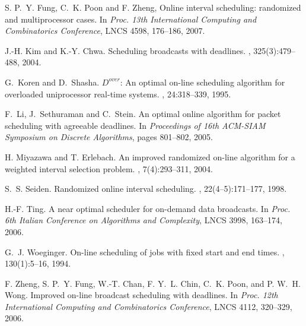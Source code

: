 \documentclass[11pt]{article}
\begin{document}
\begin{thebibliography}{10}
S. P.~Y. Fung, C.~K. Poon and F. Zheng,
\newblock Online interval scheduling: randomized and multiprocessor cases.
\newblock In {\em Proc. 13th International Computing and Combinatorics
Conference}, LNCS 4598, 176--186, 2007.

J.-H. Kim and K.-Y. Chwa.
\newblock Scheduling broadcasts with deadlines.
, 325(3):479--488, 2004.

G.~Koren and D.~Shasha.
\newblock $D^{over}$: An optimal on-line scheduling algorithm for overloaded
  uniprocessor real-time systems.
, 24:318--339, 1995.

F.~Li, J.~Sethuraman and C.~Stein.
\newblock An optimal online algorithm for packet scheduling with agreeable deadlines.
\newblock In {\em Proceedings of 16th ACM-SIAM Symposium on Discrete
  Algorithms}, pages 801--802, 2005.



H. Miyazawa and T. Erlebach.
\newblock An improved randomized on-line algorithm for a weighted interval
  selection problem.
, 7(4):293--311, 2004.

S.~S. Seiden.
\newblock Randomized online interval scheduling.
, 22(4--5):171--177, 1998.

H.-F. Ting.
\newblock A near optimal scheduler for on-demand data broadcasts.
\newblock In {\em Proc. 6th Italian Conference on Algorithms and
  Complexity}, LNCS 3998, 163--174, 2006.

G.~J. Woeginger.
\newblock On-line scheduling of jobs with fixed start and end times.
, 130(1):5--16, 1994.

F. Zheng, S. P.~Y. Fung, W.-T. Chan, F. Y.~L. Chin,
  C.~K. Poon, and P. W.~H. Wong.
\newblock Improved on-line broadcast scheduling with deadlines.
\newblock In {\em Proc. 12th International Computing and Combinatorics
  Conference}, LNCS 4112, 320--329, 2006.

\end{thebibliography}
\end{document}
